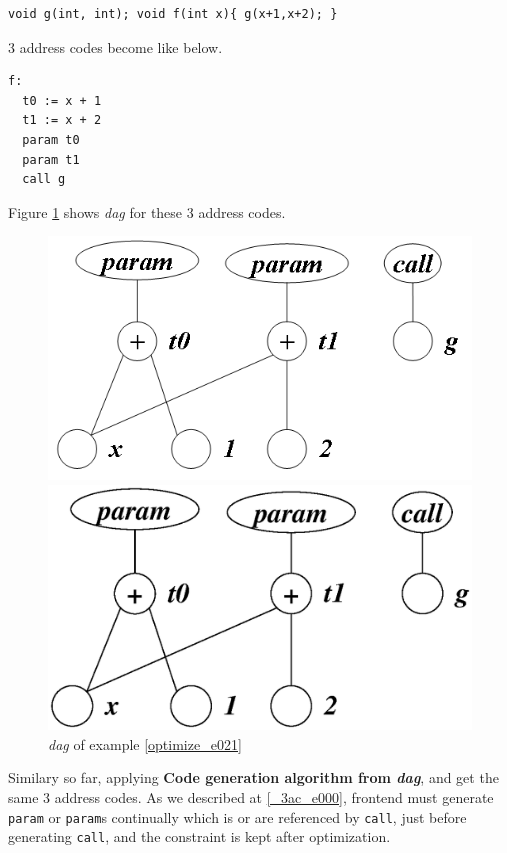 \begin{Example}
\label{optimize_e021}
\begin{verbatim}
void g(int, int); void f(int x){ g(x+1,x+2); }
\end{verbatim}
3 address codes become like below.
\begin{verbatim}
f:
  t0 := x + 1
  t1 := x + 2
  param t0
  param t1
  call g
\end{verbatim}
Figure \ref{optimize_e022} shows {\em dag} for these 3 address codes.
\begin{figure}[htbp]
\begin{center}
\begin{htmlonly}
\includegraphics[width=0.8\linewidth,height=0.470\linewidth]{opt009.png}
\end{htmlonly}
\begin{latexonly}
\includegraphics[width=0.8\linewidth,height=0.470\linewidth]{opt009.eps}
\end{latexonly}
\caption{{\em dag} of example \ref{optimize_e021}}
\label{optimize_e022}
\end{center}
\end{figure}
Similary so far, applying {\bf Code generation algorithm from {\em
 dag}}, and get the same 3 address codes.
As we described at \ref{_3ac_e000}, frontend must 
generate {\tt{param}} or {\tt{param}}s continually
which is or are referenced by {\tt{call}}, just before generating
{\tt{call}}, and the constraint is kept after optimization.
\end{Example}

